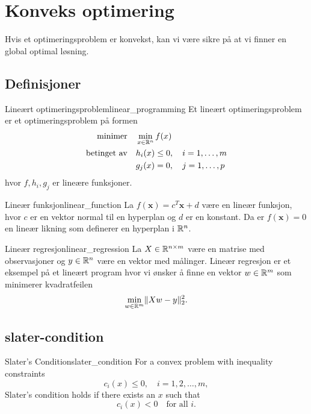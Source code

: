 \chapter{Konveks optimering}

Hvis et optimeringsproblem er konvekst, kan vi være sikre på at vi finner en global optimal løsning.

\section*{Definisjoner}

\begin{definition}{Lineært optimeringsproblem}{linear_programming}
  Et lineært optimeringsproblem er et optimeringsproblem på formen
  \begin{align*}
    \text{minimer}     & \quad \min_{x \in \mathbb{R}^n} f(x)                \\
    \text{betinget av} & \quad h_i(x) \leq 0, \quad i = 1, \ldots, m \\
                       & \quad g_j(x) = 0, \quad j = 1, \ldots, p
  \end{align*}
  hvor \(f, h_i, g_j\) er lineære funksjoner.
\end{definition}

\begin{example}{Lineær funksjon}{linear_function}
  La \(f(\symbf{x}) = c^T\symbf{x} + d\) være en lineær funksjon, hvor \(c\) er en vektor normal til en hyperplan og \(d\) er en konstant.
  Da er \(f(\symbf{x}) = 0\) en lineær likning som definerer en hyperplan i \(\mathbb{R}^n\).
\end{example}

\begin{example}{Lineær regresjon}{linear_regression}
  La \(X \in \mathbb{R}^{n \times m}\) være en matrise med observasjoner og \(y \in \mathbb{R}^n\) være en vektor med målinger.
  Lineær regresjon er et eksempel på et lineært program hvor vi ønsker å finne en vektor \(w \in \mathbb{R}^m\) som minimerer kvadratfeilen
  \begin{equation*}
    \min_{w \in \mathbb{R}^m} \lVert Xw - y\rVert_2^2.
  \end{equation*}
\end{example}

\section[Slaters betingelse]{\gls{slater-condition}}

\begin{definition}{Slater's Condition}{slater_condition}
  For a convex problem with inequality constraints
  \[
    c_i(x) \le 0,\quad i=1,2,\dots,m,
  \]
  Slater's condition holds if there exists an \(x\) such that
  \[
    c_i(x) < 0 \quad \text{for all } i.
  \]
\end{definition}

